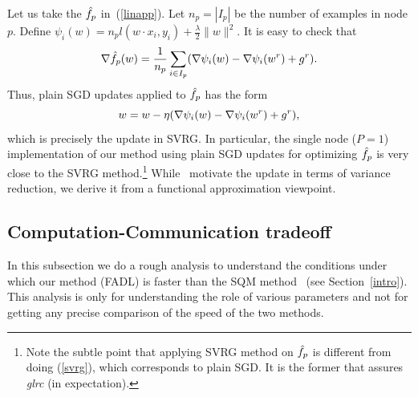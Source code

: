 \documentclass[twoside, 11pt]{article}
\begin{document}
Let us take the $\hat{f}_p$ in~(\ref{linapp}). Let $n_p=|I_p|$ be the number of examples in node $p$. Define $\psi_i(w) = n_p l(w\cdot x_i,y_i) + \frac{\lambda}{2} \|w\|^2$. It is easy to check that
\begin{equation}
\nabla\hat{f}_p(w) = \frac{1}{n_p} \sum_{i\in I_p} ( \nabla\psi_i(w) - \nabla\psi_i(w^r) + g^r).
\label{psigrad}
\end{equation}
Thus, plain SGD updates applied to $\hat{f}_p$ has the form
\begin{equation}
w = w - \eta ( \nabla\psi_i(w) - \nabla\psi_i(w^r) + g^r),
\label{svrg}
\end{equation}
which is precisely the update in SVRG. In particular, the single node ($P=1$) implementation of our method using plain SGD updates for optimizing $\hat{f}_p$ is very close to the SVRG method.\footnote{Note the subtle point that applying SVRG method on $\hat{f}_p$ is different from doing (\ref{svrg}), which corresponds to plain SGD. It is the former that assures {\it glrc} (in expectation).} While~\citet{johnson2013} motivate the update in terms of variance reduction, we derive it from a functional approximation viewpoint.

\subsection{Computation-Communication tradeoff}
\label{compcomm}

In this subsection we do a rough analysis to understand the conditions under which our method (FADL) is faster than the SQM method~\citep{chu2006,agarwal2011} (see Section~\ref{intro}). This analysis is only for understanding the role of various parameters and not for getting any precise comparison of the speed of the two methods.
\end{document}
